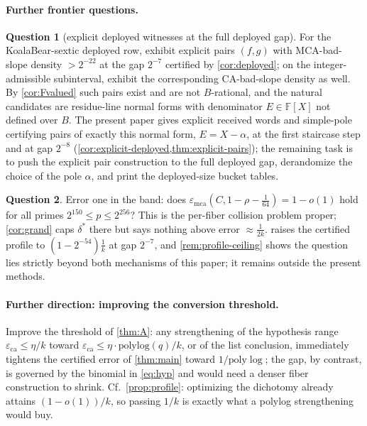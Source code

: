 \documentclass[11pt]{article}
\theoremstyle{definition}
\newtheorem{researchquestion}[researchquestion]{Question}
\theoremstyle{remark}
\newcommand{\F}{\mathbb{F}}
\newcommand{\B}{B}
\newcommand{\eca}{\varepsilon_{\mathrm{ca}}}
\newcommand{\emca}{\varepsilon_{\mathrm{mca}}}
\begin{document}
\paragraph{Further frontier questions.}

\begin{researchquestion}[explicit deployed witnesses at the full deployed gap]\label{prob:explicit}
For the KoalaBear-sextic deployed row, exhibit explicit pairs $(f,g)$ with MCA-bad-slope density $>2^{-22}$ at the gap $2^{-7}$ certified by \cref{cor:deployed}; on the integer-admissible subinterval, exhibit the corresponding CA-bad-slope density as well.  By \cref{cor:Fvalued} such pairs exist and are not $\B$-rational, and the natural candidates are residue-line normal forms with denominator $E\in\F[X]$ not defined over $\B$.  The present paper gives explicit received words and simple-pole certifying pairs of exactly this normal form, $E=X-\alpha$, at the first staircase step and at gap $2^{-8}$ \textup(\cref{cor:explicit-deployed,thm:explicit-pairs}\textup); the remaining task is to push the explicit pair construction to the full deployed gap, derandomize the choice of the pole $\alpha$, and print the deployed-size bucket tables.
\end{researchquestion}

\begin{researchquestion}\label{prob:errorone}
Error one in the band: does $\emca(C,1-\rho-\frac1{64})=1-o(1)$ hold for all primes $2^{150}\le p\le2^{256}$? This is the per-fiber collision problem proper; \cref{cor:grand} caps $\delta^*$ there but says nothing above error $\approx\frac1{2k}$.   raises the certified profile to $(1-2^{-54})\frac1k$ at gap $2^{-7}$, and \cref{rem:profile-ceiling} shows the question lies strictly beyond both mechanisms of this paper; it remains outside the present methods.
\end{researchquestion}

\paragraph{Further direction: improving the conversion threshold.}\label{ques:conversion-threshold}
Improve the threshold of \cref{thm:A}: any strengthening of the hypothesis range $\eca\le\eta/k$ toward $\eca\le\eta\cdot\mathrm{polylog}(q)/k$, or of the list conclusion, immediately tightens the certified error of \cref{thm:main} toward $1/\mathrm{poly}\log$; the gap, by contrast, is governed by the binomial in \eqref{eq:hyp} and would need a denser fiber construction to shrink.  Cf.\ \cref{prop:profile}: optimizing the dichotomy already attains $(1-o(1))/k$, so passing $1/k$ is exactly what a polylog strengthening would buy.
\end{document}
